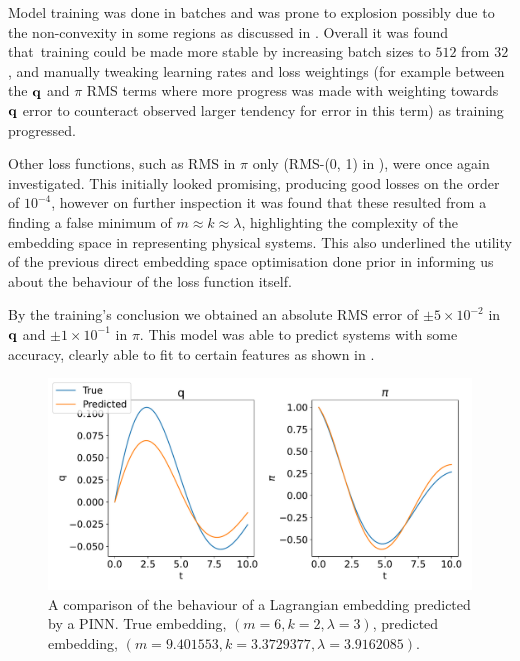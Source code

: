 Model training was done in batches and was prone to explosion possibly due to the non-convexity in some regions as discussed in . Overall it was found that training could be made more stable by increasing batch sizes to $512$ from $32$, and manually tweaking learning rates and loss weightings (for example between the $\vb q$ and $\pi$ RMS terms where more progress was made with weighting towards $\vb{q}$ error to counteract observed larger tendency for error in this term) as training progressed.

Other loss functions, such as RMS in $\pi$ only (RMS-(0, 1) in ), were once again investigated. This initially looked promising, producing good losses on the order of $10^{-4}$, however on further inspection it was found that these resulted from a finding a false minimum of $m \approx k \approx \lambda$, highlighting the complexity of the embedding space in representing physical systems. This also underlined the utility of the previous direct embedding space optimisation done prior in informing us about the behaviour of the loss function itself.

By the training's conclusion we obtained an absolute RMS error of $\pm 5 \times 10^{-2}$ in $\vb{q}$ and $\pm 1 \times 10 ^{-1}$ in $\pi$. This model was able to predict systems with some accuracy, clearly able to fit to certain features as shown in .

\begin{figure}[t]
  \includegraphics[width=\columnwidth]{figures/model-predictions.pdf}
  \caption{A comparison of the behaviour of a Lagrangian embedding predicted by a PINN. True embedding, $(m = 6, k = 2, \lambda = 3)$, predicted embedding, $(m = 9.401553,  k = 3.3729377, \lambda = 3.9162085)$.}
  \label{fig:model-prediction}
\end{figure}

